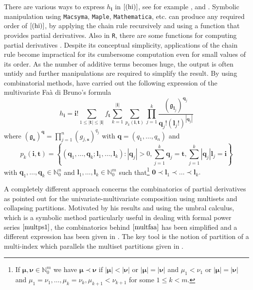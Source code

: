 There are various ways to express \(h_{\boldsymbol{i}}\) in
\(\eqref{(hi)}\), see for example \citet{MR1781515}, \citet{MR2005276}
and \citet{MR2515761}. Symbolic manipulation using \texttt{Macsyma},
\texttt{Maple}, \texttt{Mathematica}, etc. can produce any required
order of \(\eqref{(hi)}\), by applying the chain rule recursively and
using a function that provides partial derivatives. Also in \texttt{R},
there are some functions for computing partial derivatives
\citep{DERIV}. Despite its conceptual simplicity, applications of the
chain rule become impractical for its cumbersome computation even for
small values of its order. As the number of additive terms becomes huge,
the output is often untidy and further manipulations are required to
simplify the result. By using combinatorial methods, \citet{MR1325915}
have carried out the following expression of the multivariate Faà di
Bruno's formula \begin{equation} \label{multfaa}
h_{\boldsymbol{i}} = \boldsymbol{i}! \sum_{1 \leq |\boldsymbol{t}| \leq |\boldsymbol{i}|}
f_{\boldsymbol{t}} \sum_{k=1}^{|\boldsymbol{i}|} \sum_{p_k(\boldsymbol{i}, \boldsymbol{t})} \prod_{j=1}^k \frac{({\mathfrak g}_{\boldsymbol{l}_j})^{\boldsymbol{q}_j}}{\boldsymbol{q}_j! (\boldsymbol{l}_j!)^{|\boldsymbol{q}_j|}}
\end{equation} where
\(({\mathfrak g}_{\boldsymbol{s}})^{\boldsymbol{q}}=\prod_{j=1}^{n} (g_{j,\boldsymbol{s}})^{q_j}\)
with \({\boldsymbol{q}}=(q_1, \ldots, q_n)\) and \[
p_k(\boldsymbol{i}, \boldsymbol{t}) = \left\{(\boldsymbol{q}_1, \ldots, \boldsymbol{q}_k;
\boldsymbol{l}_1, \ldots, \boldsymbol{l}_k): |\boldsymbol{q}_j|>0, \sum_{j=1}^k \boldsymbol{q}_j = \boldsymbol{t},  \sum_{j=1}^k |\boldsymbol{q}_j|\boldsymbol{l}_j  = \boldsymbol{i}
\right\}\] with
\(\boldsymbol{q}_1, \ldots, \boldsymbol{q}_k \in {\mathbb N}_0^{n}\) and
\(\boldsymbol{l}_1, \ldots, \boldsymbol{l}_k \in {\mathbb N}_0^{m}\)
such that\footnote{If
  \(\boldsymbol{\mu}, \boldsymbol{\nu} \in {\mathbb N}_0^m\) we have
  \(\boldsymbol{\mu} \prec \boldsymbol{\nu}\) if
  \(|\boldsymbol{\mu}| < |\boldsymbol{\nu}|\) or
  \(|\boldsymbol{\mu}| = |\boldsymbol{\nu}|\) and \(\mu_1 < \nu_1\) or
  \(|\boldsymbol{\mu}| = |\boldsymbol{\nu}|\) and
  \(\mu_1 = \nu_1, \ldots, \mu_k = \nu_k, \mu_{k+1} < \nu_{k+1}\) for
  some \(1 \leq k < m.\)}
\(\boldsymbol{0} \prec \boldsymbol{l}_1 \prec \ldots \prec \boldsymbol{l}_k.\)

A completely different approach concerns the combinatorics of partial
derivatives as \citet{MR2200529} pointed out for the
univariate-multivariate composition using multisets and collapsing
partitions. Motivated by his results and using the umbral calculus,
which is a symbolic method particularly useful in dealing with formal
power series \(\eqref{multps1}\), the combinatorics behind
\(\eqref{multfaa}\) has been simplified and a different expression has
been given in \citet{MR2773373}. The key tool is the notion of partition
of a multi-index which parallels the multiset partitions given in
\citet{MR2200529}.

